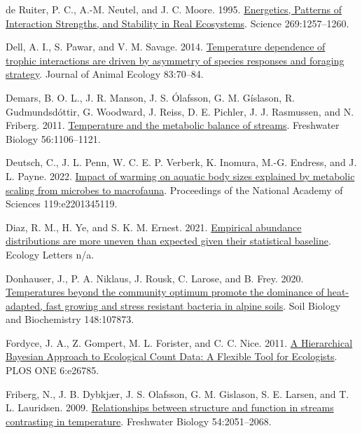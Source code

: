 \documentclass[
]{article}
\newlength{\cslhangindent}
\newlength{\cslentryspacingunit} %
\newenvironment{CSLReferences}[2] %
 {%
  \setlength{\parindent}{0pt}
  \ifodd #1
  \let\oldpar\par
  \def\par{\hangindent=\cslhangindent\oldpar}
  \fi
  \setlength{\parskip}{#2\cslentryspacingunit}
 }%
 {}
\numberwithin{equation}
\begin{document}
\begin{CSLReferences}{1}{0}
\leavevmode{}%
de Ruiter, P. C., A.-M. Neutel, and J. C. Moore. 1995.
\href{https://doi.org/10.1126/science.269.5228.1257}{Energetics,
{Patterns} of {Interaction Strengths}, and {Stability} in {Real
Ecosystems}}. Science 269:1257--1260.

\leavevmode{}%
Dell, A. I., S. Pawar, and V. M. Savage. 2014.
\href{https://doi.org/10.1111/1365-2656.12081}{Temperature dependence of
trophic interactions are driven by asymmetry of species responses and
foraging strategy}. Journal of Animal Ecology 83:70--84.

\leavevmode{}%
Demars, B. O. L., J. R. Manson, J. S. Ólafsson, G. M. Gíslason, R.
Gudmundsdóttir, G. Woodward, J. Reiss, D. E. Pichler, J. J. Rasmussen,
and N. Friberg. 2011.
\href{https://doi.org/10.1111/j.1365-2427.2010.02554.x}{Temperature and
the metabolic balance of streams}. Freshwater Biology 56:1106--1121.

\leavevmode{}%
Deutsch, C., J. L. Penn, W. C. E. P. Verberk, K. Inomura, M.-G. Endress,
and J. L. Payne. 2022.
\href{https://doi.org/10.1073/pnas.2201345119}{Impact of warming on
aquatic body sizes explained by metabolic scaling from microbes to
macrofauna}. Proceedings of the National Academy of Sciences
119:e2201345119.

\leavevmode{}%
Diaz, R. M., H. Ye, and S. K. M. Ernest. 2021.
\href{https://doi.org/10.1111/ele.13820}{Empirical abundance
distributions are more uneven than expected given their statistical
baseline}. Ecology Letters n/a.

\leavevmode{}%
Donhauser, J., P. A. Niklaus, J. Rousk, C. Larose, and B. Frey. 2020.
\href{https://doi.org/10.1016/j.soilbio.2020.107873}{Temperatures beyond
the community optimum promote the dominance of heat-adapted, fast
growing and stress resistant bacteria in alpine soils}. Soil Biology and
Biochemistry 148:107873.

\leavevmode{}%
Fordyce, J. A., Z. Gompert, M. L. Forister, and C. C. Nice. 2011.
\href{https://doi.org/10.1371/journal.pone.0026785}{A {Hierarchical
Bayesian Approach} to {Ecological Count Data}: {A Flexible Tool} for
{Ecologists}}. PLOS ONE 6:e26785.

\leavevmode{}%
Friberg, N., J. B. Dybkjær, J. S. Olafsson, G. M. Gislason, S. E.
Larsen, and T. L. Lauridsen. 2009.
\href{https://doi.org/10.1111/j.1365-2427.2009.02234.x}{Relationships
between structure and function in streams contrasting in temperature}.
Freshwater Biology 54:2051--2068.


\end{CSLReferences}
\end{document}
